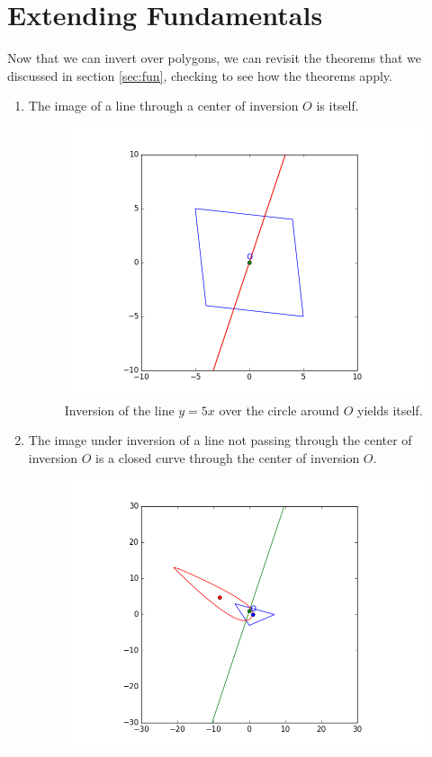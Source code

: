 \documentclass[a4paper,12pt]{article}
\numberwithin{figure}{section}
\begin{document}
    \section{Extending Fundamentals}
    
        Now that we can invert over polygons, we can revisit the theorems that we discussed in section \ref{sec:fun}, checking to see how the theorems apply.
        
        \begin{enumerate}[leftmargin=25mm,label=\textbf{Theorem \arabic*:}]
            \item The image of a line through a center of inversion $O$ is itself.
                \begin{figure}[H]
                    \centering
                    \includegraphics[scale=0.6]{./pictures/INVERT_LINE_POLY}
                    \caption{Inversion of the line $y=5x$ over the circle around $O$ yields itself.}
                    \label{fig:lpcenter}
                \end{figure}
            \item The image under inversion of a line not passing through the center of inversion $O$ is a closed curve through the center of inversion $O$.
            \begin{figure}[H]
                \centering                    \includegraphics[scale=0.6]{./pictures/INVERT_LINEOFFC_POLY}

\end{figure}
\end{enumerate}
\end{document}
